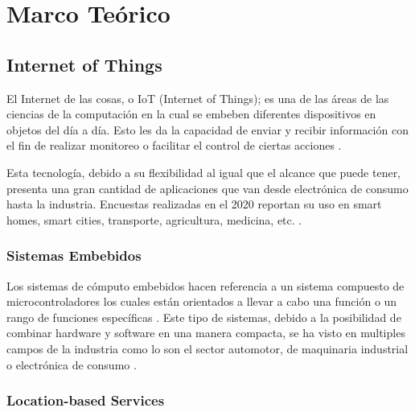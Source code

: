 \section{Marco Teórico}

\subsection{Internet of Things}


El Internet de las cosas, o IoT (Internet of Things); es una de las áreas de las ciencias de la computación en la cual  se embeben diferentes dispositivos en objetos del día a día. Esto les da la capacidad de enviar y recibir información con el fin de realizar monitoreo o facilitar el control de ciertas acciones \cite{Berte_2018}.

Esta tecnología, debido a su flexibilidad al igual que el alcance que puede tener, presenta una gran cantidad de aplicaciones que van desde electrónica de consumo hasta la industria. Encuestas realizadas en el 2020 reportan su uso en smart homes, smart cities, transporte, agricultura, medicina, etc. \cite{Dawood_2020}.

\subsubsection{Sistemas Embebidos}


Los sistemas de cómputo embebidos hacen referencia a un sistema compuesto de microcontroladores los cuales están orientados a llevar a cabo una función o un rango de funciones específicas \cite{heath2002embedded}. Este tipo de sistemas, debido a la posibilidad de combinar hardware y software en una manera compacta, se ha visto en multiples campos de la industria como lo son el sector automotor, de maquinaria industrial o electrónica de consumo \cite{deichmann_2022}.


\subsubsection{Location-based Services}

